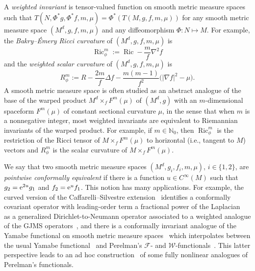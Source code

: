 \documentclass[10pt,a4paper]{amsart}
\DeclareMathOperator{\Ric}{Ric}
\newcommand{\lv}{\lvert}
\newcommand{\rv}{\rvert}
\newcommand{\mF}{\mathcal{F}}
\newcommand{\mW}{\mathcal{W}}
\newcommand{\bN}{\mathbb{N}}
\numberwithin{equation}{section}
\begin{document}
A \emph{weighted invariant} is tensor-valued function on smooth metric measure spaces such that $T(N,\Phi^\ast g,\Phi^\ast f,m,\mu) \!=\! \Phi^\ast(T(M,g,f,m,\mu))$ for any smooth metric measure space $(M^d,g,f,m,\mu)$ and any diffeomorphism $\Phi \colon N \mapsto M$.
For example, the \emph{Bakry--\'Emery Ricci curvature} of $(M^d,g,f,m,\mu)$ is
\begin{equation*}
 \Ric_\phi^m := \Ric - \frac{m}{f}\nabla^2f
\end{equation*}
and the \emph{weighted scalar curvature} of $(M^d,g,f,m,\mu)$ is
\begin{equation*}
 R_\phi^m := R - \frac{2m}{f}\Delta f - \frac{m(m-1)}{f^2}\bigl( \lv\nabla f\rv^2 - \mu \bigr) .
\end{equation*}
A smooth metric measure space is often studied as an abstract analogue of the base of the warped product $M^d \times_f F^m(\mu)$ of $(M^d,g)$ with an $m$-dimensional spaceform $F^m(\mu)$ of constant sectional curvature $\mu$, in the sense that when $m$ is a nonnegative integer, most weighted invariants are equivalent to Riemannian invariants of the warped product.
For example, if $m \in \bN_0$, then $\Ric_\phi^m$ is the restriction of the Ricci tensor of $M \times_f F^m(\mu)$ to horizontal (i.e., tangent to $M$) vectors and $R_\phi^m$ is the scalar curvature of $M \times_f F^m(\mu)$.


We say that two smooth metric measure spaces $(M^d,g_i,f_i,m,\mu)$, $i\in\{1,2\}$, are \emph{pointwise conformally equivalent} if there is a function $u\in C^\infty(M)$ such that $g_2={\rm e}^{2u}g_1$ and $f_2={\rm e}^uf_1$.
This notion has many applications. For example, the curved version of the Caffarelli--Silvestre extension~\cite{CaffarelliSilvestre2007,Case2019tr, CaseChang2013} identifies a conformally covariant operator with leading-order term a fractional power of the Laplacian~\cite{GrahamZworski2003} as a generalized Dirichlet-to-Neumann operator associated to a weighted analogue of the GJMS operators~\cite{Case2011t, CaseChang2013}, and there is a conformally invariant analogue of the Yamabe functional on smooth metric measure spaces~\cite{Case2013y} which interpolates between the usual Yamabe functional~\cite{Yamabe1960} and Perelman's $\mF$- and $\mW$-functionals~\cite{Perelman1}.
This latter perspective leads to an ad hoc construction~\cite{Case2014sd,Case2016v, Case2014s} of some fully nonlinear analogues of Perelman's functionals.
\end{document}
